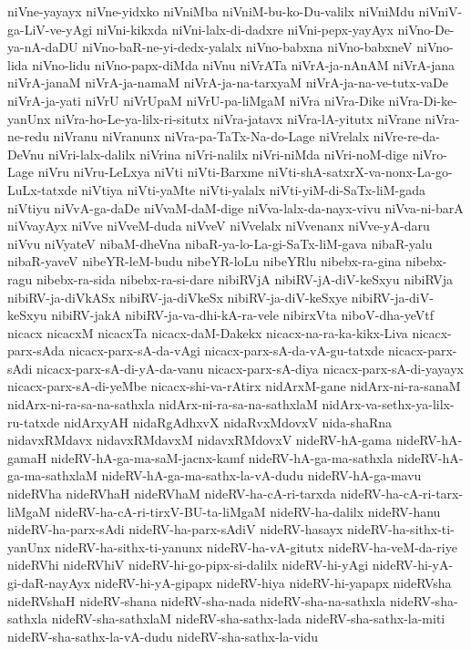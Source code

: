 {niVne-yayayx
niVne-yidxko
niVniMba
niVniM-bu-ko-Du-valilx
niVniMdu
niVniV-ga-LiV-ve-yAgi
niVni-kikxda
niVni-lalx-di-dadxre
niVni-pepx-yayAyx
niVno-De-ya-nA-daDU
niVno-baR-ne-yi-dedx-yalalx
niVno-babxna
niVno-babxneV
niVno-lida
niVno-lidu
niVno-papx-diMda
niVnu
niVrATa
niVrA-ja-nAnAM
niVrA-jana
niVrA-janaM
niVrA-ja-namaM
niVrA-ja-na-tarxyaM
niVrA-ja-na-ve-tutx-vaDe
niVrA-ja-yati
niVrU
niVrUpaM
niVrU-pa-liMgaM
niVra
niVra-Dike
niVra-Di-ke-yanUnx
niVra-ho-Le-ya-lilx-ri-situtx
niVra-jatavx
niVra-lA-yitutx
niVrane
niVra-ne-redu
niVranu
niVranunx
niVra-pa-TaTx-Na-do-Lage
niVrelalx
niVre-re-da-DeVnu
niVri-lalx-dalilx
niVrina
niVri-nalilx
niVri-niMda
niVri-noM-dige
niVro-Lage
niVru
niVru-LeLxya
niVti
niVti-Barxme
niVti-shA-satxrX-va-nonx-La-go-LuLx-tatxde
niVtiya
niVti-yaMte
niVti-yalalx
niVti-yiM-di-SaTx-liM-gada
niVtiyu
niVvA-ga-daDe
niVvaM-daM-dige
niVva-lalx-da-nayx-vivu
niVva-ni-barA
niVvayAyx
niVve
niVveM-duda
niVveV
niVvelalx
niVvenanx
niVve-yA-daru
niVvu
niVyateV
nibaM-dheVna
nibaR-ya-lo-La-gi-SaTx-liM-gava
nibaR-yalu
nibaR-yaveV
nibeYR-leM-budu
nibeYR-loLu
nibeYRlu
nibebx-ra-gina
nibebx-ragu
nibebx-ra-sida
nibebx-ra-si-dare
nibiRVjA
nibiRV-jA-diV-keSxyu
nibiRVja
nibiRV-ja-diVkASx
nibiRV-ja-diVkeSx
nibiRV-ja-diV-keSxye
nibiRV-ja-diV-keSxyu
nibiRV-jakA
nibiRV-ja-va-dhi-kA-ra-vele
nibirxVta
niboV-dha-yeVtf
nicacx
nicacxM
nicacxTa
nicacx-daM-Dakekx
nicacx-na-ra-ka-kikx-Liva
nicacx-parx-sAda
nicacx-parx-sA-da-vAgi
nicacx-parx-sA-da-vA-gu-tatxde
nicacx-parx-sAdi
nicacx-parx-sA-di-yA-da-vanu
nicacx-parx-sA-diya
nicacx-parx-sA-di-yayayx
nicacx-parx-sA-di-yeMbe
nicacx-shi-va-rAtirx
nidArxM-gane
nidArx-ni-ra-sanaM
nidArx-ni-ra-sa-na-sathxla
nidArx-ni-ra-sa-na-sathxlaM
nidArx-va-sethx-ya-lilx-ru-tatxde
nidArxyAH
nidaRgAdhxvX
nidaRvxMdovxV
nida-shaRna
nidavxRMdavx
nidavxRMdavxM
nidavxRMdovxV
nideRV-hA-gama
nideRV-hA-gamaH
nideRV-hA-ga-ma-saM-jacnx-kamf
nideRV-hA-ga-ma-sathxla
nideRV-hA-ga-ma-sathxlaM
nideRV-hA-ga-ma-sathx-la-vA-dudu
nideRV-hA-ga-mavu
nideRVha
nideRVhaH
nideRVhaM
nideRV-ha-cA-ri-tarxda
nideRV-ha-cA-ri-tarx-liMgaM
nideRV-ha-cA-ri-tirxV-BU-ta-liMgaM
nideRV-ha-dalilx
nideRV-hanu
nideRV-ha-parx-sAdi
nideRV-ha-parx-sAdiV
nideRV-hasayx
nideRV-ha-sithx-ti-yanUnx
nideRV-ha-sithx-ti-yanunx
nideRV-ha-vA-gitutx
nideRV-ha-veM-da-riye
nideRVhi
nideRVhiV
nideRV-hi-go-pipx-si-dalilx
nideRV-hi-yAgi
nideRV-hi-yA-gi-daR-nayAyx
nideRV-hi-yA-gipapx
nideRV-hiya
nideRV-hi-yapapx
nideRVsha
nideRVshaH
nideRV-shana
nideRV-sha-nada
nideRV-sha-na-sathxla
nideRV-sha-sathxla
nideRV-sha-sathxlaM
nideRV-sha-sathx-lada
nideRV-sha-sathx-la-miti
nideRV-sha-sathx-la-vA-dudu
nideRV-sha-sathx-la-vidu
}
